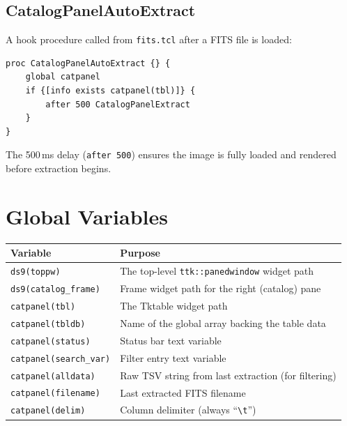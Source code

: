 \documentclass[11pt,fleqn]{book}
\begin{document}
\subsection{CatalogPanelAutoExtract}

A hook procedure called from \texttt{fits.tcl} after a FITS file is loaded:

\begin{codebox}
\begin{lstlisting}[style=tcl,numbers=none]
proc CatalogPanelAutoExtract {} {
    global catpanel
    if {[info exists catpanel(tbl)]} {
        after 500 CatalogPanelExtract
    }
}
\end{lstlisting}
\end{codebox}

The 500\,ms delay (\texttt{after 500}) ensures the image is fully loaded and rendered before extraction begins.


\section{Global Variables}

\begin{center}
\begin{longtable}{L{4.0cm} L{9.0cm}}
\toprule
\textbf{Variable} & \textbf{Purpose} \\
\midrule
\endhead
\texttt{ds9(toppw)} & The top-level \texttt{ttk::panedwindow} widget path \\
\texttt{ds9(catalog\_frame)} & Frame widget path for the right (catalog) pane \\
\texttt{catpanel(tbl)} & The Tktable widget path \\
\texttt{catpanel(tbldb)} & Name of the global array backing the table data \\
\texttt{catpanel(status)} & Status bar text variable \\
\texttt{catpanel(search\_var)} & Filter entry text variable \\
\texttt{catpanel(alldata)} & Raw TSV string from last extraction (for filtering) \\
\texttt{catpanel(filename)} & Last extracted FITS filename \\
\texttt{catpanel(delim)} & Column delimiter (always ``\texttt{\textbackslash t}'') \\
\bottomrule
\end{longtable}
\end{center}


\end{document}
